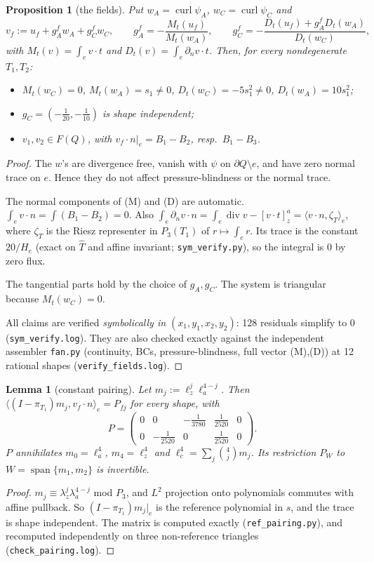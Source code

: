 \documentclass[11pt]{article}
\newtheorem{lemma}[theorem]{Lemma}
\newtheorem{proposition}[theorem]{Proposition}
\theoremstyle{remark}
\newcommand{\ip}[2]{\langle #1,#2\rangle}
\begin{document}
\begin{proposition}[the fields]\label{prop:fields}
Put $w_A=\operatorname{curl}\psi_A$, $w_C=\operatorname{curl}\psi_C$ and
\[
v_f:=u_f+g_A^fw_A+g_C^fw_C,\qquad g_A^f=-\frac{M_t(u_f)}{M_t(w_A)},\qquad
g_C^f=-\frac{D_t(u_f)+g_A^fD_t(w_A)}{D_t(w_C)},
\]
with $M_t(v)=\int_ev\cdot t$ and $D_t(v)=\int_e\partial_nv\cdot t$. Then, for every nondegenerate $T_1,T_2$:
\begin{itemize}
\item $M_t(w_C)=0$, $M_t(w_A)=s_1\ne0$, $D_t(w_C)=-5s_1^2\ne0$, $D_t(w_A)=10s_1^2$;
\item $g_C=(-\tfrac1{20},-\tfrac1{10})$ is shape independent;
\item $v_1,v_2\in F(Q)$, with $v_f\cdot n|_e=B_1-B_2$, resp.\ $B_1-B_3$.
\end{itemize}
\end{proposition}
\begin{proof}
The $w$'s are divergence free, vanish with $\psi$ on $\partial Q\setminus e$, and have zero normal trace on $e$. Hence they do not affect
pressure-blindness or the normal trace.

The normal components of (M) and (D) are automatic. $\int_ev\cdot n=\int(B_1-B_2)=0$. Also
$\int_e\partial_nv\cdot n=\int_e\operatorname{div}v-[v\cdot t]_z^a=\ip{v\cdot n}{\zeta_T}_e$, where $\zeta_T$ is the Riesz representer in $P_3(T_1)$ of
$r\mapsto\int_er$. Its trace is the constant $20/H_e$ (exact on $\hat T$ and affine invariant; \texttt{sym\_verify.py}), so the integral is
$0$ by zero flux.

The tangential parts hold by the choice of $g_A,g_C$. The system is triangular because $M_t(w_C)=0$.

All claims are verified \emph{symbolically in $(x_1,y_1,x_2,y_2)$}: 128 residuals simplify to $0$ (\texttt{sym\_verify.log}). They are also checked
exactly against the independent assembler \texttt{fan.py} (continuity, BCs, pressure-blindness, full vector (M),(D)) at 12 rational shapes
(\texttt{verify\_fields.log}).
\end{proof}

\begin{lemma}[constant pairing]\label{lem:pair}
Let $m_j:=\ell_z^j\ell_a^{4-j}$. Then $\ip{(I-\pi_{T_1})m_j}{v_f\cdot n}_e=P_{fj}$ for every shape, with
\[
P=\begin{pmatrix}0&0&-\frac1{3780}&\frac1{2520}&0\\[2pt]0&-\frac1{2520}&0&\frac1{2520}&0\end{pmatrix}.
\]
$P$ annihilates $m_0=\ell_a^4$, $m_4=\ell_z^4$ and $\ell_c^4=\sum_j\binom4jm_j$. Its restriction $P_W$ to $W=\operatorname{span}\{m_1,m_2\}$ is invertible.
\end{lemma}
\begin{proof}
$m_j\equiv\lambda_z^j\lambda_a^{4-j}$ mod $P_3$, and $L^2$ projection onto polynomials commutes with affine pullback. So
$(I-\pi_{T_1})m_j|_e$ is the reference polynomial in $s$, and the trace is shape independent. The matrix is computed exactly
(\texttt{ref\_pairing.py}), and recomputed independently on three non-reference triangles (\texttt{check\_pairing.log}).
\end{proof}
\end{document}
